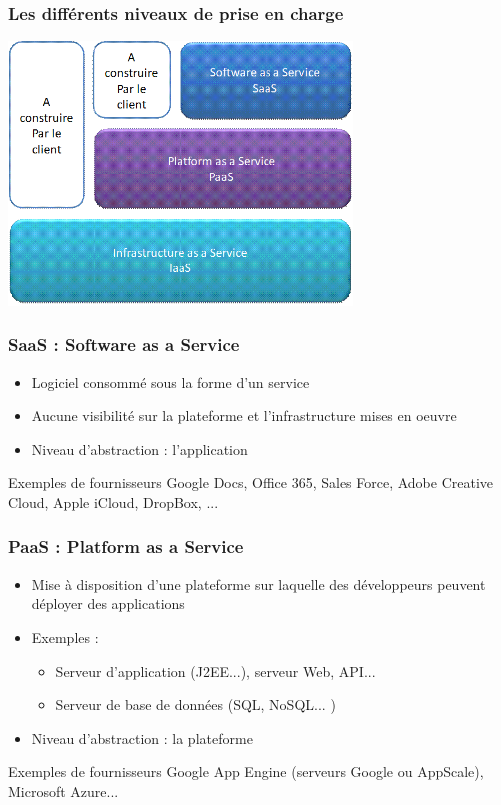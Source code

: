 \begin{frame}
  \frametitle{Les différents niveaux de prise en charge \cite{intro-cloud}}
  \includegraphics[height=7cm]{../illustration/niveaux-cloud.png}       
\end{frame}

\begin{frame}
\frametitle{SaaS : Software as a Service \cite{wp-saas}}
\begin{itemize}
\item Logiciel consommé sous la forme d’un service
\item Aucune visibilité sur la plateforme et l'infrastructure mises en oeuvre
\item Niveau d'abstraction : l'application
\end{itemize}
\begin{exampleblock}{Exemples de fournisseurs}
Google Docs, Office 365, Sales Force, Adobe Creative Cloud, Apple iCloud, DropBox, ... 
\end{exampleblock}
\end{frame}

\begin{frame}
\frametitle{PaaS : Platform as a Service}
\begin{itemize}
\item Mise à disposition d'une plateforme sur laquelle des développeurs peuvent déployer des applications
\item Exemples : 
\begin{itemize}
\item Serveur d'application (J2EE...), serveur Web, API...
\item Serveur de base de données (SQL, NoSQL... )
\end{itemize}
\item Niveau d'abstraction : la plateforme
\end{itemize}
\begin{exampleblock}{Exemples de fournisseurs}
Google App Engine (serveurs Google ou AppScale), Microsoft Azure...
\end{exampleblock}
\end{frame}


